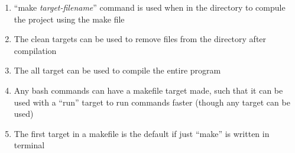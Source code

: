 \documentclass[11 pt, twoside]{article}
\begin{document}
\begin{enumerate}
\begin{enumerate}
\item ``make \textit{target-filename}'' command is used when in the directory to compule the project using the make file
\item The clean targets can be used to remove files from the directory after compilation
\item The all target can be used to compile the entire program
\item Any bash commands can have a makefile target made, such that it can be used with a ``run'' target to run commands faster (though any target can be used)
\item The first target in a makefile is the default if just ``make'' is written in terminal
\end{enumerate}
\end{enumerate}
\end{document}
